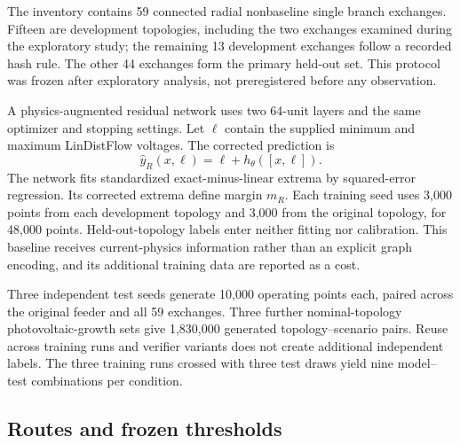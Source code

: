 The inventory contains 59 connected radial nonbaseline single branch exchanges. Fifteen are development topologies, including the two exchanges examined during the exploratory study; the remaining 13 development exchanges follow a recorded hash rule. The other 44 exchanges form the primary held-out set. This protocol was frozen after exploratory analysis, not preregistered before any observation.

A physics-augmented residual network uses two 64-unit layers and the same optimizer and stopping settings. Let $\ell$ contain the supplied minimum and maximum LinDistFlow voltages. The corrected prediction is
\begin{equation}
 \hat y_R(x,\ell)=\ell+h_\theta([x,\ell]).
 \label{eq:residual}
\end{equation}
The network fits standardized exact-minus-linear extrema by squared-error regression. Its corrected extrema define margin $m_R$. Each training seed uses 3,000 points from each development topology and 3,000 from the original topology, for 48,000 points. Held-out-topology labels enter neither fitting nor calibration. This baseline receives current-physics information rather than an explicit graph encoding, and its additional training data are reported as a cost.

Three independent test seeds generate 10,000 operating points each, paired across the original feeder and all 59 exchanges. Three further nominal-topology photovoltaic-growth sets give 1,830,000 generated topology--scenario pairs. Reuse across training runs and verifier variants does not create additional independent labels. The three training runs crossed with three test draws yield nine model--test combinations per condition.

\subsection{Routes and frozen thresholds}

